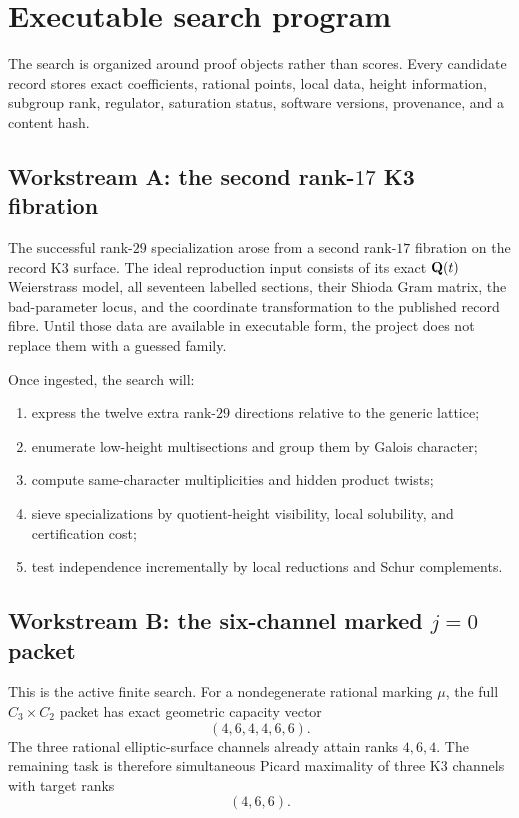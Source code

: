 \section{Executable search program}

The search is organized around proof objects rather than scores.  Every
candidate record stores exact coefficients, rational points, local data,
height information, subgroup rank, regulator, saturation status, software
versions, provenance, and a content hash.

\subsection{Workstream A: the second rank-$17$ K3 fibration}

The successful rank-$29$ specialization arose from a second rank-$17$
fibration on the record K3 surface.  The ideal reproduction input consists of
its exact $\mathbf Q(t)$ Weierstrass model, all seventeen labelled sections, their
Shioda Gram matrix, the bad-parameter locus, and the coordinate transformation
to the published record fibre.  Until those data are available in executable
form, the project does not replace them with a guessed family.

Once ingested, the search will:
\begin{enumerate}[leftmargin=*]
\item express the twelve extra rank-$29$ directions relative to the generic lattice;
\item enumerate low-height multisections and group them by Galois character;
\item compute same-character multiplicities and hidden product twists;
\item sieve specializations by quotient-height visibility, local solubility, and certification cost;
\item test independence incrementally by local reductions and Schur complements.
\end{enumerate}

\subsection{Workstream B: the six-channel marked $j=0$ packet}

This is the active finite search.  For a nondegenerate rational marking
$\mu$, the full $C_3\times C_2$ packet has exact geometric capacity vector
\[
(4,6,4,4,6,6).
\]
The three rational elliptic-surface channels already attain ranks $4,6,4$.
The remaining task is therefore simultaneous Picard maximality of three K3
channels with target ranks
\[
(4,6,6).
\]

